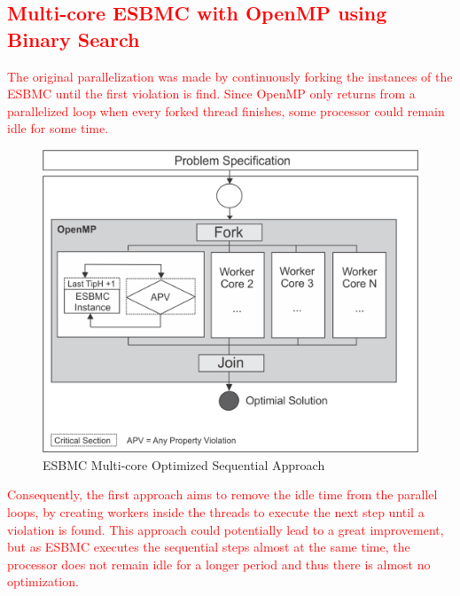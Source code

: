 \subsection{\textcolor{Red}{Multi-core ESBMC with OpenMP using Binary Search}}

\textcolor{Red}{The original parallelization was made by continuously forking the instances of the ESBMC until the first violation is find. Since OpenMP only returns from a parallelized loop when every forked thread finishes, some processor could remain idle for some time.}

\begin{figure}[ht]
	\centering
  \includegraphics[scale=0.75]{Image/esbmc-parallel.png} 
	\caption{ESBMC Multi-core Optimized Sequential Approach}
	\label{fig2}
\end{figure}

\textcolor{Red}{Consequently, the first approach aims to remove the idle time from the parallel loops, by creating workers inside the threads to execute the next step until a violation is found. This approach could potentially lead to a great improvement, but as ESBMC executes the sequential steps almost at the same time, the processor does not remain idle for a longer period and thus there is almost no optimization.}

